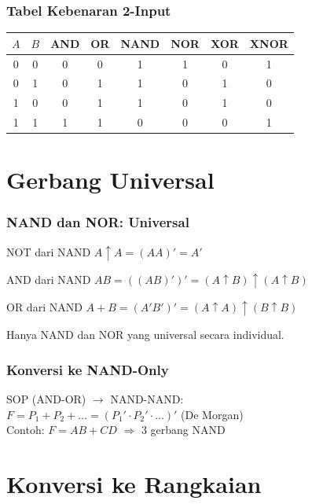 \documentclass[handout]{beamer}
\theoremstyle{definition}
\theoremstyle{example}
\begin{document}
\begin{frame}
\frametitle{Tabel Kebenaran 2-Input}
\begin{center}
\small
\begin{tabular}{|c|c||c|c|c|c|c|c|}
\hline
$A$ & $B$ & AND & OR & NAND & NOR & XOR & XNOR \\ \hline
0 & 0 & 0 & 0 & 1 & 1 & 0 & 1 \\ \hline
0 & 1 & 0 & 1 & 1 & 0 & 1 & 0 \\ \hline
1 & 0 & 0 & 1 & 1 & 0 & 1 & 0 \\ \hline
1 & 1 & 1 & 1 & 0 & 0 & 0 & 1 \\ \hline
\end{tabular}
\end{center}
\end{frame}

\section{Gerbang Universal}

\begin{frame}
\frametitle{NAND dan NOR: Universal}
\begin{block}{NOT dari NAND}
$A \uparrow A = (AA)' = A'$
\end{block}
\begin{block}{AND dari NAND}
$AB = ((AB)')' = (A \uparrow B) \uparrow (A \uparrow B)$
\end{block}
\begin{block}{OR dari NAND}
$A+B = (A'B')' = (A \uparrow A) \uparrow (B \uparrow B)$
\end{block}
Hanya NAND dan NOR yang universal secara individual.
\end{frame}

\begin{frame}
\frametitle{Konversi ke NAND-Only}
SOP (AND-OR) $\rightarrow$ NAND-NAND:\\
$F = P_1 + P_2 + \ldots = (P_1' \cdot P_2' \cdot \ldots)'$ (De Morgan)\\
Contoh: $F = AB + CD$ $\Rightarrow$ 3 gerbang NAND
\end{frame}

\section{Konversi ke Rangkaian}
\end{document}
